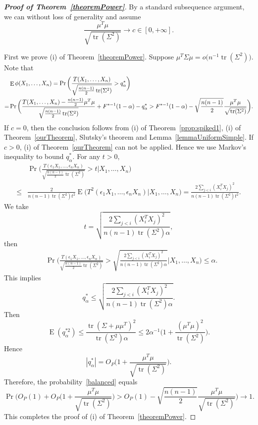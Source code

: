 \documentclass[3p]{elsarticle}
\DeclareMathOperator{\mytr}{tr}
\DeclareMathOperator{\myE}{E}
\theoremstyle{plain}
\theoremstyle{definition}
\theoremstyle{remark}
\begin{document}
\begin{proof}[\textbf{Proof of Theorem~\ref{theoremPower}}]
By a standard subsequence argument, we can without loss of generality and assume
$$
\frac{\mu^T \mu}{\sqrt{\mytr(\Sigma^2)}}\to c\in [0,+\infty].
$$

    First we prove (i) of Theorem~\ref{theoremPower}.
    Suppose $\mu^T \Sigma \mu= o\big(n^{-1}\mytr(\Sigma^2)\big)$.
    Note that
    \begin{align}
        &\myE \phi(X_1,\ldots, X_n)=\Pr\bigg(\frac{T( X_1,\ldots, X_n)}{\sqrt{\frac{n(n-1)}{2}\mytr(\Sigma^2)}}>q_{\alpha}^* \bigg)\notag
        \\
            =&
            \Pr\bigg(\frac{T( X_1,\ldots, X_n)-\frac{n(n-1)}{2}\mu^T\mu}{\sqrt{\frac{n(n-1)}{2}\mytr(\Sigma^2)}}+F^{*-1}(1-\alpha)-q_{\alpha}^*>
F^{*-1}(1-\alpha)
            -\sqrt{\frac{n(n-1)}{2}}\frac{\mu^T\mu}{\sqrt{\mytr(\Sigma^2)}} \bigg).
            \label{balanced}
    \end{align}
    If $c=0$, then the conclusion follows from (i) of Theorem~\ref{prop:spiked1}, (i) of Theorem~\ref{ourTheorem}, Slutsky's theorem and Lemma~\ref{lemmaUniformSimple}.
    If $c>0$, (i) of Theorem~\ref{ourTheorem} can not be applied. Hence we use Markov's inequality to bound $q^*_{\alpha}$.
    For any $t>0$,
    $$
    \begin{aligned}
        &\Pr\bigg(\frac{T(\epsilon_1 X_1,\ldots, \epsilon_n X_n)}{\sqrt{\frac{n(n-1)}{2}\mytr(\Sigma^2)}}>t\bigg| X_1,\ldots,X_n\bigg)
        \\
        \leq &
       \frac{2}{{n(n-1)}\mytr(\Sigma^2) t^2}  \myE\big(T^2(\epsilon_1 X_1,\ldots, \epsilon_n X_n)\big| X_1,\ldots,X_n\big)
        =\frac{2\sum_{j<i}(X_i^T X_j)^2}{{n(n-1)}\mytr(\Sigma^2) t^2}.
    \end{aligned}
    $$
    We take
    $$t=
    \sqrt{
        \frac{2\sum_{j<i}(X_i^T X_j)^2}{{n(n-1)}\mytr(\Sigma^2) \alpha}
    },
    $$
    then
    $$
    \begin{aligned}
        &\Pr\bigg(\frac{T(\epsilon_1 X_1,\ldots, \epsilon_n X_n)}{\sqrt{\frac{n(n-1)}{2}\mytr(\Sigma^2)}}>
\sqrt{\frac{2\sum_{j<i}(X_i^T X_j)^2}{{n(n-1)}\mytr(\Sigma^2) \alpha}}
        \bigg| X_1,\ldots,X_n\bigg)
        \leq 
        \alpha.
    \end{aligned}
    $$
    This implies
    $$
    q_{\alpha}^*\leq
\sqrt{\frac{2\sum_{j<i}(X_i^T X_j)^2}{{n(n-1)}\mytr(\Sigma^2) \alpha}}.
    $$
    Then
    $$
   \myE (q_{\alpha}^{*2})\leq  \frac{\mytr(\Sigma+\mu\mu^T)^2}{\mytr(\Sigma^2)\alpha}\leq  2\alpha^{-1} \Big(1+\frac{(\mu^T \mu)^2}{\mytr(\Sigma^2)}\Big).
    $$
    Hence
    \begin{equation}\label{finally}
        |q_{\alpha}^{*}|=O_P\Big(1+\frac{\mu^T \mu}{\sqrt{\mytr(\Sigma^2)}}\Big).
    \end{equation}
    Therefore, the probability~\eqref{balanced} equals
    $$
    \Pr\bigg(O_P(1)+O_P\Big(1+\frac{\mu^T \mu}{\sqrt{\mytr(\Sigma^2)}}\Big)>O_P(1)-\sqrt{\frac{n(n-1)}{2}}\frac{\mu^T \mu}{\sqrt{\mytr(\Sigma^2)}}\bigg)\to 1.
    $$
This completes the proof of (i) of Theorem~\ref{theoremPower}.


\end{proof}
\end{document}
